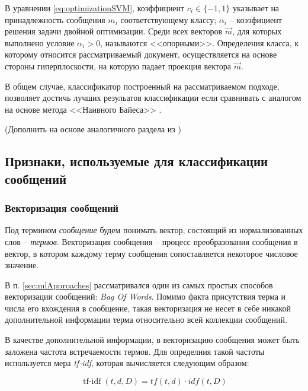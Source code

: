         В уравнении \ref{eq:optimizationSVM}, коэффициент $c_i \in \{-1, 1\}$
        указывает на принадлежность сообщения $m_i$ соответствующему классу;
        $\alpha_i$ -- коээфициент решения задачи двойной оптимизации. Среди всех
        векторов $\vec{m}$, для которых выполнено условие $\alpha_i > 0$, называются <<опорными>>.
        Определения класса, к которому относится рассматриваемый документ, осуществляется
        на основе стороны гиперплоскости, на которую падает проекция вектора $\vec{m}$.

        В общем случае, классификатор построенный на рассматриваемом подходе,
        позволяет достичь лучших резульатов классификации если сравнивать с
        аналогом на основе метода <<Наивного Байеса>> \cite{svmCompareVsNB}.

        (Дополнить на основе аналогичного раздела из \cite{islr})

    \subsection{Признаки, используемые для классификации сообщений}
        \subsubsection{Векторизация сообщений}
        Под термином {\it сообщение} будем понимать вектор, состоящий из
        нормализованных слов -- {\it термов}. Векторизация сообщения -- процесс
        преобразования сообщения в вектор, в котором каждому терму сообщения
        сопоставляется некоторое числовое значение.

        В п. \ref{sec:mlApproaches} рассматривался один из самых простых
        способов векторизации сообщений: {\it Bag Of Words}. Помимо факта присутствия
        терма и числа его вхождения в сообщение, такая векторизация не несет в
        себе никакой дополнительной информации терма относительно всей коллекции
        сообщений.

        В качестве дополнительной информации, в векторизацию сообщения может
        быть заложена частота встречаемости термов. Для определния такой частоты
        используется мера {\it tf-idf}, которая вычисляется следующим образом:

        \newcommand\tfidf{\mathop{\mbox{$tf$-$idf$}}}
        \begin{equation}
            \label{eq:tfidf}
            \tfidf(t,d,D) = tf(t,d) \cdot idf(t, D)
        \end{equation}

